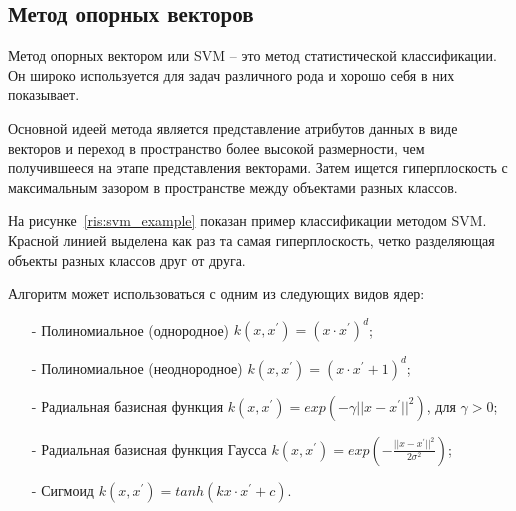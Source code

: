 \subsection{Метод опорных векторов}
Метод опорных вектором или SVM -- это метод статистической классификации. Он широко используется для задач различного рода и хорошо себя в них показывает.
\par
Основной идеей метода является представление атрибутов данных в виде векторов и переход в пространство более высокой размерности, чем получившееся на этапе представления векторами. Затем ищется гиперплоскость с максимальным зазором в пространстве между объектами разных классов.
\par
На рисунке~\ref{ris:svm_example} показан пример классификации методом SVM. Красной линией выделена как раз та самая гиперплоскость, четко разделяющая объекты разных классов друг от друга.
\\
\par
Алгоритм может использоваться с одним из следующих видов ядер:
\begin{itemize}
	\item[-] Полиномиальное (однородное) $k(x,x^{'}) = (x \cdot x^{'})^{d}$;
	\item[-] Полиномиальное (неоднородное) $k(x,x^{'}) = (x \cdot x^{'} + 1)^{d}$;
	\item[-] Радиальная базисная функция $k(x,x^{'}) = exp(-\gamma ||x - x^{'}||^{2})$, для $\gamma > 0$;
	\item[-] Радиальная базисная функция Гаусса $k(x,x^{'}) = exp\left ( -\frac{||x - x^{'}||^{2}}{2\sigma^{2}} \right )$;
	\item[-] Сигмоид $k(x,x^{'}) = tanh(kx\cdot x^{'} + c)$.
\end{itemize}
